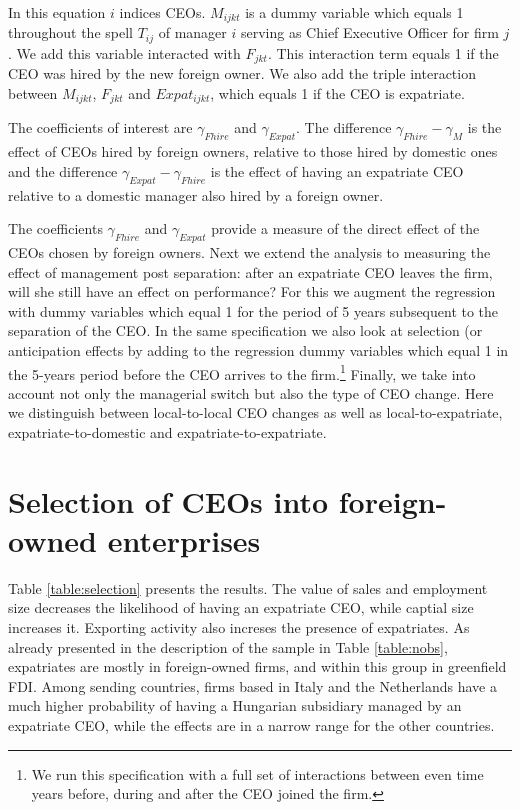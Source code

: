 \documentclass[12pt,a4paper]{article}
\begin{document}
In this equation $i$ indices CEOs. $M_{ijkt}$ is a dummy variable which equals 1 throughout the spell $T_{ij}$ of manager $i$ serving as Chief Executive Officer for firm $j$. We add this variable interacted with $F_{jkt}$. This interaction term equals 1 if the CEO was hired by the new foreign owner. We also add the triple interaction between $M_{ijkt}$, $F_{jkt}$ and $Expat_{ijkt}$, which equals 1 if the CEO is expatriate. 

The coefficients of interest are $\gamma_{Fhire}$ and $\gamma_{Expat}$. The difference $\gamma_{Fhire}-\gamma_{M}$ is the effect of CEOs hired by foreign owners, relative to those hired by domestic ones and the difference $\gamma_{Expat}-\gamma_{Fhire}$ is the effect of having an expatriate CEO relative to a domestic manager also hired by a foreign owner.

The coefficients $\gamma_{Fhire}$ and $\gamma_{Expat}$ provide a measure of the direct effect of the CEOs chosen by foreign owners. Next we extend the analysis to measuring the effect of management post separation: after an expatriate CEO leaves the firm, will she still have an effect on performance? For this we augment the regression with dummy variables which equal 1 for the period of 5 years subsequent to the separation of the CEO. In the same specification we also look at selection (or anticipation effects by adding to the regression dummy variables which equal 1 in the 5-years period before the CEO arrives to the firm.\footnote{We run this specification with a full set of interactions between even time years before, during and after the CEO joined the firm.} Finally, we take into account not only the managerial switch but also the type of CEO change. Here we distinguish between local-to-local CEO changes as well as local-to-expatriate, expatriate-to-domestic and expatriate-to-expatriate.

\section{Selection of CEOs into foreign-owned enterprises}
Table \ref{table:selection} presents the results. The value of sales and employment size decreases the likelihood of having an expatriate CEO, while captial size increases it.  Exporting activity also increses the presence of expatriates.  As already presented in the description of the sample in Table \ref{table:nobs}, expatriates are mostly in foreign-owned firms, and within this group in greenfield FDI.  Among sending countries, firms based in Italy and the Netherlands have a much higher probability of having a Hungarian subsidiary managed by an expatriate CEO, while the effects are in a narrow range for the other countries.
\end{document}
